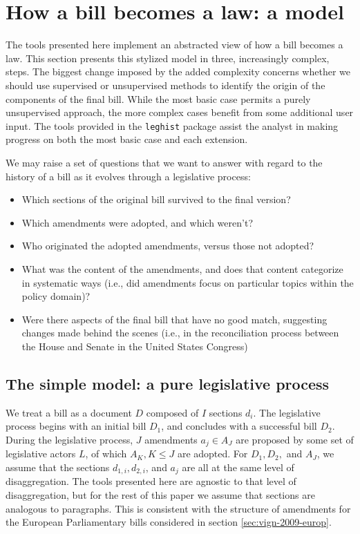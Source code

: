 \documentclass[11pt]{article}
\begin{document}
\section{How a bill becomes a law: a model}
\label{sec:how-bill-becomes}

The tools presented here implement an abstracted view of how a bill
becomes a law. This section presents this stylized model in three,
increasingly complex, steps. The biggest change imposed by the added
complexity concerns whether we should use supervised or unsupervised
methods to identify the origin of the components of the final
bill. While the most basic case permits a purely unsupervised
approach, the more complex cases benefit from some additional user
input. The tools provided in the
\texttt{leghist} package assist the analyst in making progress on both
the most basic case and each extension. 

We may raise a set of questions that we want to answer with regard to
the history of a bill as it evolves through a legislative process:
\begin{itemize}
\item Which sections of the original bill survived to the final version?
\item Which amendments were adopted, and which weren't?
\item Who originated the adopted amendments, versus those not adopted?
\item What was the content of the amendments, and does that content
  categorize in systematic ways (i.e., did amendments focus on
  particular topics within the policy domain)?
\item Were there aspects of the final bill that have no good match,
  suggesting changes made behind the scenes (i.e., in the
  reconciliation process between the House and Senate in the United States Congress)
\end{itemize}


\subsection{The simple model: a pure legislative process}
\label{sec:simple-model:-pure}

We treat a bill as a document $D$ composed of $I$ sections $d_i$. The
legislative process begins with an initial bill $D_1$, and concludes
with a successful bill $D_2$. During the legislative process, $J$
amendments $a_j \in A_J$ are
proposed by some set of legislative actors $L$, of which $A_K, K \leq
J$ are adopted. For $D_1, D_2,$ and $A_J$, we assume that the sections
$d_{1,i}, d_{2,i}$, and $a_j$ are all at the same level of
disaggregation. The tools presented here are agnostic to that level of
disaggregation, but for the rest of this paper we assume that sections
are analogous to paragraphs. This is consistent with the structure of
amendments for the European Parliamentary bills considered in section
\ref{sec:vign-2009-europ}.
\end{document}

